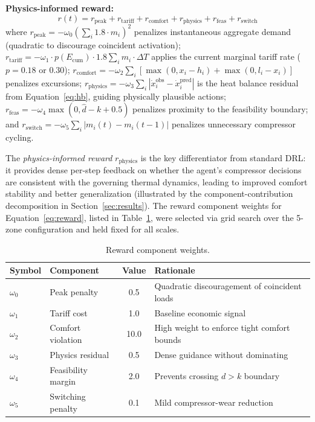 \documentclass[12pt,a4paper]{article}
\begin{document}
\textbf{Physics-informed reward:}
\begin{equation}
r(t) = r_{\text{peak}} + r_{\text{tariff}} + r_{\text{comfort}} + r_{\text{physics}} + r_{\text{feas}} + r_{\text{switch}}
\label{eq:reward}
\end{equation}
where $r_{\text{peak}} = -\omega_0 (\sum_i 1.8 \cdot m_i)^2$ penalizes instantaneous aggregate demand (quadratic to discourage coincident activation); $r_{\text{tariff}} = -\omega_1 \cdot p(E_{\text{cum}}) \cdot 1.8 \sum_i m_i \cdot \Delta T$ applies the current marginal tariff rate ($p = 0.18$ or $0.30$); $r_{\text{comfort}} = -\omega_2 \sum_i [\max(0, x_i - h_i) + \max(0, l_i - x_i)]$ penalizes excursions; $r_{\text{physics}} = -\omega_3 \sum_i |\dot{x}_i^{\text{obs}} - \dot{x}_i^{\text{pred}}|$ is the heat balance residual from Equation~\eqref{eq:hb}, guiding physically plausible actions; $r_{\text{feas}} = -\omega_4 \max(0, \hat{d} - k + 0.5)$ penalizes proximity to the feasibility boundary; and $r_{\text{switch}} = -\omega_5 \sum_i |m_i(t) - m_i(t\!-\!1)|$ penalizes unnecessary compressor cycling.

The \textit{physics-informed reward} $r_{\text{physics}}$ is the key differentiator from standard DRL: it provides dense per-step feedback on whether the agent's compressor decisions are consistent with the governing thermal dynamics, leading to improved comfort stability and better generalization (illustrated by the component-contribution decomposition in Section~\ref{sec:results}). The reward component weights for Equation~\eqref{eq:reward}, listed in Table~\ref{tab:weights}, were selected via grid search over the 5-zone configuration and held fixed for all scales.

\begin{table}[H]
\centering
\caption{Reward component weights.}
\label{tab:weights}
\begin{tabular*}{\textwidth}{@{\extracolsep{\fill}}llcl@{}}
\toprule
\textbf{Symbol} & \textbf{Component} & \textbf{Value} & \textbf{Rationale} \\
\midrule
$\omega_0$ & Peak penalty & 0.5 & Quadratic discouragement of coincident loads \\
$\omega_1$ & Tariff cost & 1.0 & Baseline economic signal \\
$\omega_2$ & Comfort violation & 10.0 & High weight to enforce tight comfort bounds \\
$\omega_3$ & Physics residual & 0.5 & Dense guidance without dominating \\
$\omega_4$ & Feasibility margin & 2.0 & Prevents crossing $d > k$ boundary \\
$\omega_5$ & Switching penalty & 0.1 & Mild compressor-wear reduction \\
\bottomrule
\end{tabular*}
\end{table}
\end{document}
